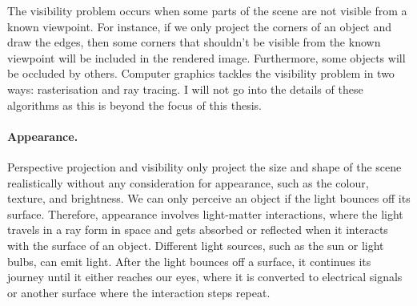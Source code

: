 The visibility problem occurs when some parts of the scene are not visible from a known viewpoint. For instance, if we only project the corners of an object and draw the edges, then some corners that shouldn't be visible from the known viewpoint will be included in the rendered image. Furthermore, some objects will be occluded by others. Computer graphics tackles the visibility problem in two ways: rasterisation and ray tracing. I will not go into the details of these algorithms as this is beyond the focus of this thesis.


\paragraph{Appearance.}
Perspective projection and visibility only project the size and shape of the scene realistically without any consideration for appearance, such as the colour, texture, and brightness. We can only perceive an object if the light bounces off its surface. Therefore, appearance involves light-matter interactions, where the light travels in a ray form in space and gets absorbed or reflected when it interacts with the surface of an object. Different light sources, such as the sun or light bulbs, can emit light. After the light bounces off a surface, it continues its journey until it either reaches our eyes, where it is converted to electrical signals or another surface where the interaction steps repeat.

